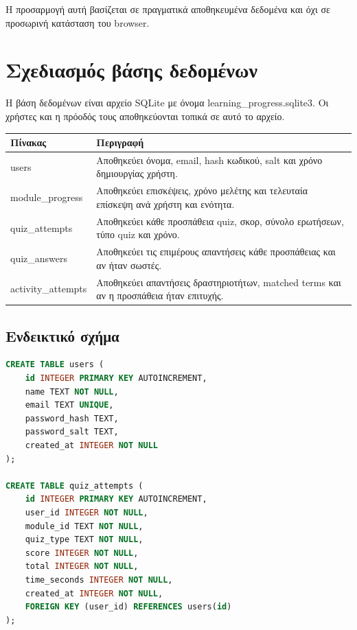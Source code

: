 \documentclass[a4paper]{article}
\newcommand{\textlatin}[1]{\textenglish{#1}}
\begin{document}
Η προσαρμογή αυτή βασίζεται σε πραγματικά αποθηκευμένα δεδομένα και όχι σε προσωρινή κατάσταση του browser.

\section{Σχεδιασμός βάσης δεδομένων}

Η βάση δεδομένων είναι αρχείο \textlatin{SQLite} με όνομα \textlatin{learning\_progress.sqlite3}. Οι χρήστες και η πρόοδός τους αποθηκεύονται τοπικά σε αυτό το αρχείο.

\begin{longtable}{|p{4cm}|p{10cm}|}
\hline
\textbf{Πίνακας} & \textbf{Περιγραφή} \\
\hline
\textlatin{users} & Αποθηκεύει όνομα, email, hash κωδικού, salt και χρόνο δημιουργίας χρήστη. \\
\hline
\textlatin{module\_progress} & Αποθηκεύει επισκέψεις, χρόνο μελέτης και τελευταία επίσκεψη ανά χρήστη και ενότητα. \\
\hline
\textlatin{quiz\_attempts} & Αποθηκεύει κάθε προσπάθεια quiz, σκορ, σύνολο ερωτήσεων, τύπο quiz και χρόνο. \\
\hline
\textlatin{quiz\_answers} & Αποθηκεύει τις επιμέρους απαντήσεις κάθε προσπάθειας και αν ήταν σωστές. \\
\hline
\textlatin{activity\_attempts} & Αποθηκεύει απαντήσεις δραστηριοτήτων, matched terms και αν η προσπάθεια ήταν επιτυχής. \\
\hline
\end{longtable}

\subsection{Ενδεικτικό σχήμα}

\begin{lstlisting}[language=SQL]
CREATE TABLE users (
    id INTEGER PRIMARY KEY AUTOINCREMENT,
    name TEXT NOT NULL,
    email TEXT UNIQUE,
    password_hash TEXT,
    password_salt TEXT,
    created_at INTEGER NOT NULL
);

CREATE TABLE quiz_attempts (
    id INTEGER PRIMARY KEY AUTOINCREMENT,
    user_id INTEGER NOT NULL,
    module_id TEXT NOT NULL,
    quiz_type TEXT NOT NULL,
    score INTEGER NOT NULL,
    total INTEGER NOT NULL,
    time_seconds INTEGER NOT NULL,
    created_at INTEGER NOT NULL,
    FOREIGN KEY (user_id) REFERENCES users(id)
);
\end{lstlisting}
\end{document}
